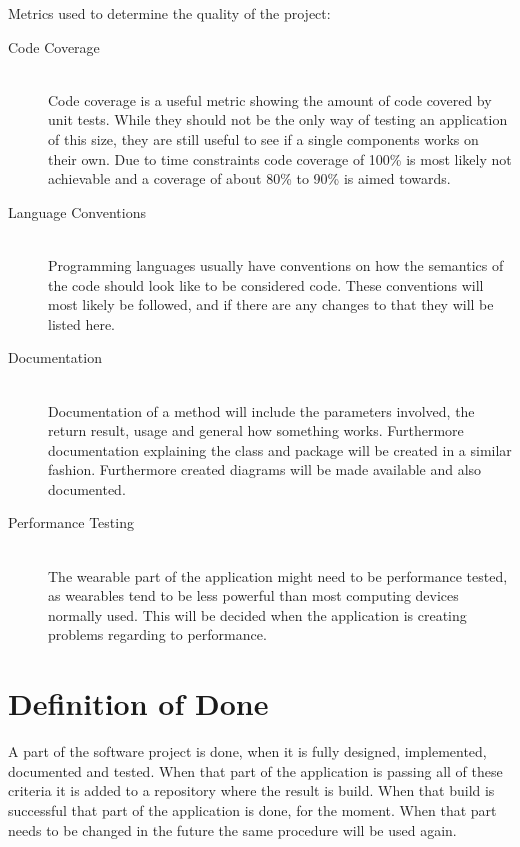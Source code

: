 Metrics used to determine the quality of the project:

\begin{description}
	\item[Code Coverage] \hfill \\
		Code coverage is a useful metric showing the amount of code covered by unit tests. While they should not be the only way of testing an application of this size, they are still useful to see if a single components works on their own. Due to time constraints code coverage of 100\% is most likely not achievable and a coverage of about 80\% to 90\% is aimed towards.
	\item[Language Conventions] \hfill \\
		Programming languages usually have conventions on how the semantics of the code should look like to be considered code. These conventions will most likely be followed, and if there are any changes to that they will be listed here.
	\item[Documentation] \hfill \\
		Documentation of a method will include the parameters involved, the return result, usage and general how something works. Furthermore documentation explaining the class and package will be created in a similar fashion. Furthermore created diagrams will be made available and also documented.
	\item[Performance Testing] \hfill \\
		The wearable part of the application might need to be performance tested, as wearables tend to be less powerful than most computing devices normally used. This will be decided when the application is creating problems regarding to performance.
\end{description}

\section{Definition of Done}\label{sec:definitionOfDone}
A part of the software project is done, when it is fully designed, implemented, documented and tested. When that part of the application is passing all of these criteria it is added to a repository where the result is build. When that build is successful that part of the application is done, for the moment. When that part needs to be changed in the future the same procedure will be used again.
